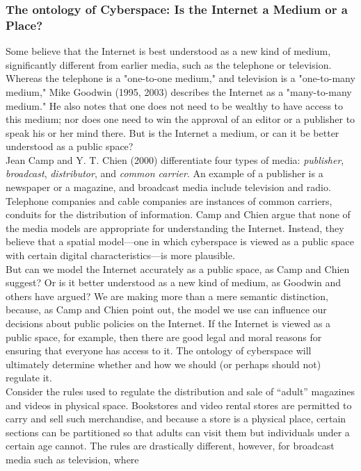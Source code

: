 \documentclass[12pt]{article}
\theoremstyle{definition}
\begin{document}
\subsubsection{The ontology of Cyberspace: Is the Internet a Medium or a Place?}
Some believe that the Internet is best understood as a new kind of medium,
significantly different from earlier media, such as the telephone or television. Whereas
the telephone is a "one-to-one medium," and television is a "one-to-many medium,"
Mike Goodwin (1995, 2003) describes the Internet as a "many-to-many medium." He
also notes that one does not need to be wealthy to have access to this medium; nor does
one need to win the approval of an editor or a publisher to speak his or her mind there.
But is the Internet a medium, or can it be better understood as a public space?\\
Jean Camp and Y. T. Chien (2000) differentiate four types of media: \textit{publisher},
\textit{broadcast}, \textit{distributor}, and \textit{common carrier}. An example of a publisher is a newspaper or a
magazine, and broadcast media include television and radio. Telephone companies and
cable companies are instances of common carriers, conduits for the distribution of
information. Camp and Chien argue that none of the media models are appropriate
for understanding the Internet. Instead, they believe that a spatial model—one in which
cyberspace is viewed as a public space with certain digital characteristics—is more
plausible.\\
But can we model the Internet accurately as a public space, as Camp and Chien
suggest? Or is it better understood as a new kind of medium, as Goodwin and others have
argued? We are making more than a mere semantic distinction, because, as Camp and
Chien point out, the model we use can influence our decisions about public policies on the
Internet. If the Internet is viewed as a public space, for example, then there are good legal
and moral reasons for ensuring that everyone has access to it. The ontology of cyberspace
will ultimately determine whether and how we should (or perhaps should not) regulate it.\\
Consider the rules used to regulate the distribution and sale of “adult” magazines
and videos in physical space. Bookstores and video rental stores are permitted to carry
and sell such merchandise, and because a store is a physical place, certain sections can
be partitioned so that adults can visit them but individuals under a certain age cannot.
The rules are drastically different, however, for broadcast media such as television, where
\end{document}
